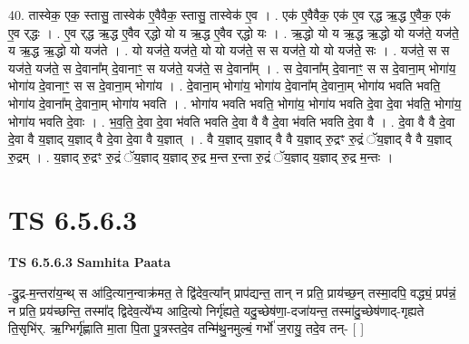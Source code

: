 \documentclass[17pt]{extarticle}
\begin{document}
40. तास्वेक॒ एक॒ स्तासु॒ तास्वेक॑ ए॒वैवैक॒ स्तासु॒ तास्वेक॑ ए॒व । . एक॑ ए॒वैवैक॒ एक॑ ए॒व र्‌द्ध ऋ॒द्ध ए॒वैक॒ एक॑ ए॒व र्‌द्धः । . ए॒व र्‌द्ध ऋ॒द्ध ए॒वैव र्‌द्धो यो य ऋ॒द्ध ए॒वैव र्‌द्धो यः । . ऋ॒द्धो यो य ऋ॒द्ध ऋ॒द्धो यो यज॑ते॒ यज॑ते॒ य ऋ॒द्ध ऋ॒द्धो यो यज॑ते । . यो यज॑ते॒ यज॑ते॒ यो यो यज॑ते॒ स स यज॑ते॒ यो यो यज॑ते॒ सः । . यज॑ते॒ स स यज॑ते॒ यज॑ते॒ स दे॒वाना᳚म् दे॒वानाꣳ॒॒ स यज॑ते॒ यज॑ते॒ स दे॒वाना᳚म् । . स दे॒वाना᳚म् दे॒वानाꣳ॒॒ स स दे॒वाना॒म् भोगा॑य॒ भोगा॑य दे॒वानाꣳ॒॒ स स दे॒वाना॒म् भोगा॑य । . दे॒वाना॒म् भोगा॑य॒ भोगा॑य दे॒वाना᳚म् दे॒वाना॒म् भोगा॑य भवति भवति॒ भोगा॑य दे॒वाना᳚म् दे॒वाना॒म् भोगा॑य भवति । . भोगा॑य भवति भवति॒ भोगा॑य॒ भोगा॑य भवति दे॒वा दे॒वा भ॑वति॒ भोगा॑य॒ भोगा॑य भवति दे॒वाः । . भ॒व॒ति॒ दे॒वा दे॒वा भ॑वति भवति दे॒वा वै वै दे॒वा भ॑वति भवति दे॒वा वै । . दे॒वा वै वै दे॒वा दे॒वा वै य॒ज्ञाद् य॒ज्ञाद् वै दे॒वा दे॒वा वै य॒ज्ञात् । . वै य॒ज्ञाद् य॒ज्ञाद् वै वै य॒ज्ञाद् रु॒द्रꣳ रु॒द्रं ॅय॒ज्ञाद् वै वै य॒ज्ञाद् रु॒द्रम् । . य॒ज्ञाद् रु॒द्रꣳ रु॒द्रं ॅय॒ज्ञाद् य॒ज्ञाद् रु॒द्र म॒न्त र॒न्ता रु॒द्रं ॅय॒ज्ञाद् य॒ज्ञाद् रु॒द्र म॒न्तः । \newline
\pagebreak
{}

\section{ TS 6.5.6.3 }

\textbf{TS 6.5.6.3 } \newline
\textbf{Samhita Paata} \newline

-द्रु॒द्र-म॒न्तरा॑य॒न्थ् स आ॑दि॒त्यान॒न्वाक्र॑मत॒ ते द्वि॑देव॒त्या᳚न् प्राप॑द्यन्त॒ तान् न प्रति॒ प्राय॑च्छ॒न् तस्मा॒दपि॒ वद्ध्यं॒ प्रप॑न्नं॒ न प्रति॒ प्रय॑च्छन्ति॒ तस्मा᳚द् द्विदेव॒त्ये᳚भ्य आदि॒त्यो निर्गृ॑ह्यते॒ यदु॒च्छेष॑णा॒-दजा॑यन्त॒ तस्मा॑दु॒च्छेष॑णाद्-गृह्यते ति॒सृभि॑र्. ऋ॒ग्भिर्गृ॑ह्णाति मा॒ता पि॒ता पु॒त्रस्तदे॒व तन्मि॑थु॒नमुल्बं॒ गर्भो॑ ज॒रायु॒ तदे॒व तन्- [  ] \newline
\end{document}
